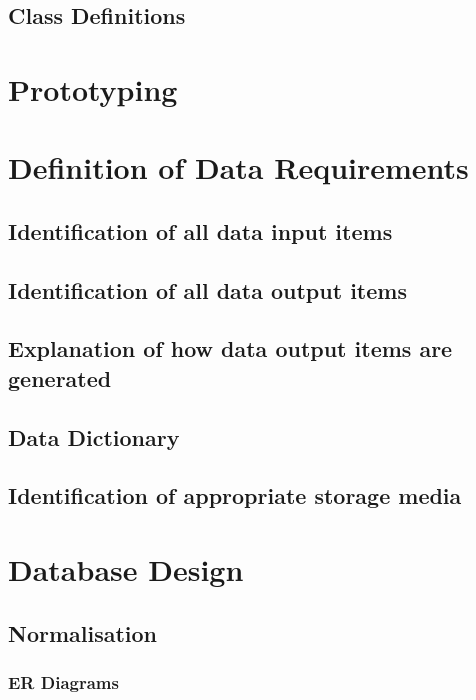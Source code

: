 \subsection{Class Definitions}

\section{Prototyping}

\section{Definition of Data Requirements}

\subsection{Identification of all data input items}

\subsection{Identification of all data output items}

\subsection{Explanation of how data output items are generated}

\subsection{Data Dictionary}

\subsection{Identification of appropriate storage media}

\section{Database Design}

\subsection{Normalisation}

\subsubsection{ER Diagrams}

